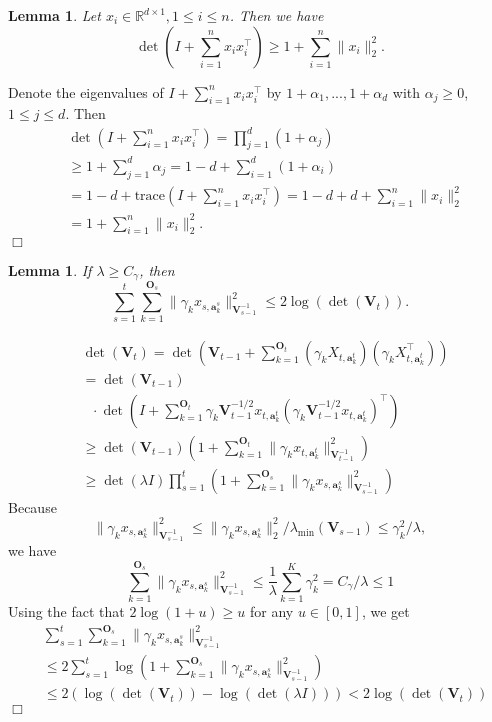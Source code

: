 \documentclass{article}
\newcommand{\RR}{\mathbb{R}}
\newcommand{\ba}{\mathbf{a}}
\newcommand{\bO}{\mathbf{O}}
\newcommand{\bV}{\mathbf{V}}
\newcommand{\trace}{\mathrm{trace}}
\newcommand{\norm}[1]{\| #1 \|}
\newtheorem{lemma}[theorem]{Lemma}%
\newenvironment{proof}{\noindent {\textbf{Proof. }}}{$\Box$ \medskip}
\begin{document}
\begin{lemma} %
Let $x_i \in \RR^{d \times 1}, 1 \leq i \leq n$. Then we have
$$
\det(I + \sum_{i=1}^n x_i x_i^{\top}) \geq 1 + \sum_{i=1}^n \norm{x_i}_2^2.
$$
\end{lemma}
\begin{proof}
Denote the eigenvalues of $I + \sum_{i=1}^n x_i x_i^{\top}$ by $1+\alpha_1,...,1+\alpha_d$ with $\alpha_j \geq 0$, $1\leq j\leq d$. Then
\begin{align*}
&\det(I + \sum_{i=1}^n x_i x_i^{\top})= \prod_{j=1}^d (1 + \alpha_j)\\
&\geq 1 +\sum_{j=1}^d \alpha_j =1-d + \sum_{i=1}^d (1+\alpha_i) \\
&=1-d + \trace(I + \sum_{i=1}^n x_i x_i^{\top})= 1-d + d + \sum_{i=1}^n \norm{x_i}_2^2\\
&=1 + \sum_{i=1}^n \norm{x_i}_2^2.
\end{align*}
\end{proof}

\begin{lemma}
If $\lambda \geq C_\gamma$, then
$$
\sum_{s=1}^t \sum_{k=1}^{\bO_s} \norm{\gamma_k x_{s,\ba_{k}^s}}_{\bV_{s-1}^{-1}}^2 \leq 2\log(\det(\bV_t)).
$$
\end{lemma}
\begin{proof}
\begin{align*}
&\det(\bV_t) = \det(\bV_{t-1} + \sum_{k=1}^{\bO_t} (\gamma_k X_{t,\ba_k^{t}})(\gamma_k X_{t, \ba_k^{t}}^{\top}))\\
&=\det(\bV_{t-1})\\
&~~~\cdot \det(I + \sum_{k=1}^{\bO_t} \gamma_k \bV_{t-1}^{-1/2}x_{t,\ba_{k}^{t}} (\gamma_k \bV_{t-1}^{-1/2}x_{t,\ba_{k}^{t}})^{\top})\\
&\geq \det(\bV_{t-1}) (1 + \sum_{k=1}^{\bO_t} \norm{\gamma_k x_{t,\ba_k^t}}_{\bV_{t-1}^{-1}}^2)\\
&\geq \det(\lambda I)\prod_{s=1}^{t}(1 + \sum_{k=1}^{\bO_s} \norm{\gamma_k x_{s,\ba_k^s}}_{\bV_{s-1}^{-1}}^2)
\end{align*}
Because
$$
\norm{\gamma_k x_{s,\ba_k^s}}_{\bV_{s-1}^{-1}}^2 \leq \norm{\gamma_k x_{s,\ba_k^s}}_2^2/\lambda_{\min}(\bV_{s-1}) \leq \gamma_k^2 /\lambda,
$$
we have 
$$
\sum_{k=1}^{\bO_s} \norm{\gamma_k x_{s,\ba_k^s}}_{\bV_{s-1}^{-1}}^2 \leq \frac{1}{\lambda} \sum_{k=1}^{K} \gamma_k^2 = C_\gamma /\lambda \leq 1
$$
Using the fact that $ 2\log(1+u) \geq u$ for any $u \in [0,1]$, we get
\begin{align*}
&\sum_{s=1}^t \sum_{k=1}^{\bO_s}\norm{\gamma_k x_{s,\ba_{k}^s}}_{\bV_{s-1}^{-1}}^2 \\
&\leq 2\sum_{s=1}^t\log(1 + \sum_{k=1}^{\bO_s} \norm{\gamma_k x_{s,\ba_k^s}}_{\bV_{s-1}^{-1}}^2)\\
&\leq 2(\log(\det(\bV_t)) - \log(\det(\lambda I))) < 2\log(\det(\bV_t))
\end{align*}
\end{proof}
\end{document}
